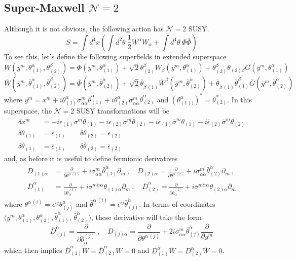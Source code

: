 \documentclass[a4paper,12pt]{article}
\numberwithin{equation}{section}
\numberwithin{exe}{section}
\newcommand{\p}{{\partial}}
\newcommand{\Db}{{\bar D}}
\newcommand{\Wb}{{\bar W}}
\renewcommand{\a}{{\alpha}}
\newcommand{\ad}{{\dot\alpha}}
\renewcommand{\b}{{\beta}}
\renewcommand{\d}{{\delta}}
\newcommand{\e}{{\epsilon}}
\newcommand{\eb}{{\bar\epsilon}}
\newcommand{\s}{{\sigma}}
\renewcommand{\sb}{{\bar\sigma}}
\renewcommand{\t}{{\theta}}
\newcommand{\tb}{{\bar\theta}}
\newcommand{\Phib}{{\bar \Phi}}
\begin{document}
\subsection{Super-Maxwell $\mathcal N=2$}
Although it is not obvious, the following action has $\mathcal N=2$ SUSY.
	\begin{equation}\label{n2theory}
	S = \int d^4x \left( \int d^2\t\ \frac12 W^\a W_\a + \int d^4\t\ \Phi\Phib \right)
	\end{equation}
To see this, let's define the following superfields in extended superspace
	\begin{equation}
	W(y^m, \t^\a_{(1)}, \t^\b_{(2)}) = \Phi(y^m, \t^\a_{(1)}) + \sqrt 2\t^\b_{(2)} W_\b(y^m, \t^\a_{(1)}) + \t^\b_{(2)}\t_{(2)\b} G(y^m, \t^\a_{(1)})
	\end{equation}
	\begin{equation}
	\bar W(\bar y^m, \bar\t^{\dot\a}_{(1)}, \bar\t^{\dot\b}_{(2)}) = \bar\Phi(\bar y^m, \bar\t^{\dot\a}_{(2)}) + \sqrt 2\bar\t_{{\dot\b}\,{(1)}} \bar W^{\dot\b} 
	(\bar y^m, \bar\t^{\dot\a}_{(2)}) + \bar\t_{{\dot\b}\,{(1)}}\bar\t_{(1)}^{\dot\b} \bar G(\bar y^m, \bar\t^{\dot\a}_{(2)})
	\end{equation}
where $y^m = x^m + i\t^\a_{(1)}\s^m_{\a\ad}\tb^\ad_{(1)} + i\t^\a_{(2)} \s^m_{\a\ad}\tb^\ad_{(2)}$ and $(\t^\a_{(1))})^*=
\bar\t^{\dot\a}_{(2)}$. In this superspace, the $\mathcal N=2$ SUSY transformations will be
	\begin{equation}
		\begin{aligned}
		\d x^m & = -i \e_{(1)} \s^m\tb_{(1)} -i\e_{(2)}\s^m\tb_{(2)} -i\eb_{(1)}\sb^m\t_{(1)}-i\eb_{(2)}\sb^m\t_{(2)} \\
		\d\t_{(1)} & =\e_{(1)}\qquad \d\t_{(2)}=\e_{(2)} \\
		\d\tb_{(1)} & =\eb_{(1)}\qquad \d\tb_{(2)}=\eb_{(2)}
		\end{aligned}
	\end{equation}
and, as before it is useful to define fermionic derivatives
	\begin{equation}
		\begin{aligned}
		D_{(1)\a} & = \frac{\p}{\p\t^{\a \,(1)}} + i\s^m_{\a\ad}\tb^\ad_{(1)}\p_m\ ,\quad D_{(2)\a} = \frac{\p}{\p\t^{\a\,(2)}} + i\s^m_{\a\ad} \tb^\ad_{(2)}\p_m \ , \\
		\Db^\ad_{(1)} & = \frac{\p}{\p\tb^{(1)}_\ad} + i\sb^{m\ad\a} \t_{(1)\a}\p_m\ ,\quad \Db^\ad_{(2)} = \frac{\p}{\p\tb^{(2)}_\ad} + i\sb^{m\ad\a} \t_{(2)\a}\p_m
		\end{aligned}
	\end{equation}
	where $\t^{\a\,{(i)}} = \epsilon^{ij}\t^\a_{(j)}$ and $\bar\t^{\dot\a\,{(i)}} = \epsilon^{ij}\bar\t^{\dot\a}_{(j)}$.
In terms of coordinates $(y^m, \t^\a_{(1)}, \t^\a_{(2)}, \tb^\ad_{(1)}$, $\tb^\ad_{(2)})$, these derivative will take the form
	\begin{equation}
	\Db^\ad_{(j)} = \frac{\p}{\p\tb^{(j)}_\ad}\ ,\quad D_{(j)\a} = \frac{\p}{\p\t^{\a\,(j)}} + 2i\s^m_{\a\ad} \tb^\ad_{(j)} \frac{\p}{\p y^m}
	\end{equation}
which then implies $\Db^\ad_{(1)} W = \Db^\ad_{(2)} W= 0$ and $D^\a_{(1)} \Wb = D^\a_{(2)} \Wb = 0$.
\end{document}
